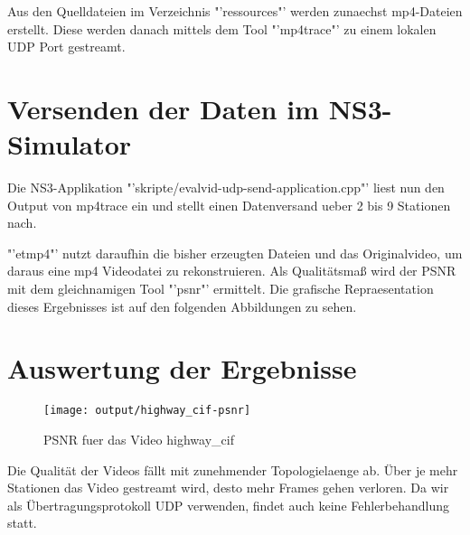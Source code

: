 \documentclass[12pt,a4paper,titlepage]{article}
\begin{document}
Aus den Quelldateien im Verzeichnis "'ressources"' werden zunaechst mp4-Dateien erstellt. Diese werden danach mittels dem Tool "'mp4trace"' zu einem lokalen UDP Port gestreamt.

\section{Versenden der Daten im NS3-Simulator}

Die NS3-Applikation "'skripte/evalvid-udp-send-application.cpp"' liest nun den Output von mp4trace ein und stellt einen Datenversand ueber 2 bis 9 Stationen nach.

"'etmp4"' nutzt daraufhin die bisher erzeugten Dateien und das Originalvideo, um daraus eine mp4 Videodatei zu rekonstruieren. Als Qualitätsmaß wird der PSNR mit dem gleichnamigen Tool "'psnr"' ermittelt. Die grafische Repraesentation dieses Ergebnisses ist auf den folgenden Abbildungen zu sehen.

\section{Auswertung der Ergebnisse}

\begin{figure}[h]
	\centering
% 	
	\texttt{[image: output/highway\_cif-psnr]}
	\caption{PSNR fuer das Video highway\_cif}
	\label{fig:Durchsatz}
\end{figure}


Die Qualität der Videos fällt mit zunehmender Topologielaenge ab. Über je mehr Stationen das Video gestreamt wird, desto mehr Frames gehen verloren. Da wir als Übertragungsprotokoll UDP verwenden, findet auch keine Fehlerbehandlung statt.
\end{document}
